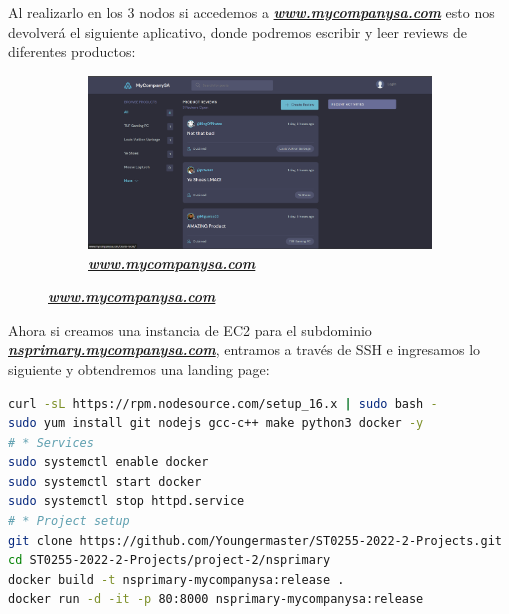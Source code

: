 Al realizarlo en los 3 nodos si accedemos a 
\textbf{\textit{\url{www.mycompanysa.com}}} esto nos devolverá el siguiente
aplicativo, donde podremos escribir y leer reviews de diferentes productos:

\begin{figure}[H]
    \centering
    \begin{subfigure}[b]{0.8\textwidth}
        \centering
        \includegraphics[width=\textwidth]{Figures/0. General/www.mycompanysa.com.png}
        \caption{\textbf{\textit{\url{www.mycompanysa.com}}}}
        \label{fig: www.mycompanysa.com config}
    \end{subfigure}
\end{figure}

Ahora si creamos una instancia de EC2 para el subdominio
\textbf{\textit{\url{nsprimary.mycompanysa.com}}}, entramos a través de SSH e
ingresamos lo siguiente y obtendremos una landing page:

\begin{lstlisting}[language=Bash]
curl -sL https://rpm.nodesource.com/setup_16.x | sudo bash -
sudo yum install git nodejs gcc-c++ make python3 docker -y
# * Services
sudo systemctl enable docker
sudo systemctl start docker
sudo systemctl stop httpd.service
# * Project setup
git clone https://github.com/Youngermaster/ST0255-2022-2-Projects.git
cd ST0255-2022-2-Projects/project-2/nsprimary
docker build -t nsprimary-mycompanysa:release .
docker run -d -it -p 80:8000 nsprimary-mycompanysa:release
\end{lstlisting}

